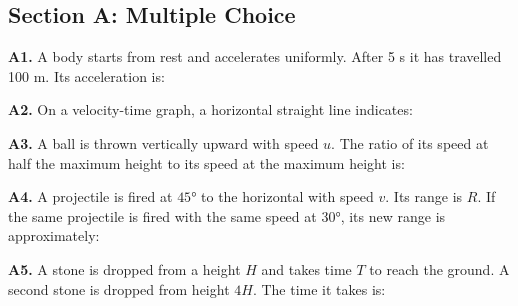 \newpage
\begin{exercisebox}[3]

\subsection*{Section A: Multiple Choice}

\textbf{A1.} A body starts from rest and accelerates
uniformly. After 5 s it has travelled 100 m. Its
acceleration is:


\vspace{0.4cm}

\textbf{A2.} On a velocity-time graph, a horizontal
straight line indicates:


\vspace{0.4cm}

\textbf{A3.} A ball is thrown vertically upward with
speed $u$. The ratio of its speed at half the maximum
height to its speed at the maximum height is:


\vspace{0.4cm}

\textbf{A4.} A projectile is fired at $45°$ to the
horizontal with speed $v$. Its range is $R$. If the
same projectile is fired with the same speed at $30°$,
its new range is approximately:


\vspace{0.4cm}

\textbf{A5.} A stone is dropped from a height $H$ and
takes time $T$ to reach the ground. A second stone is
dropped from height $4H$. The time it takes is:



\end{exercisebox}
